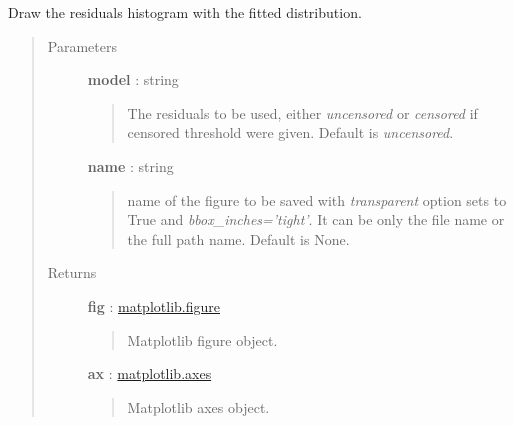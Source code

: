 \documentclass[letterpaper,10pt,english]{sphinxmanual}
\begin{document}
\begin{fulllineitems}
\begin{fulllineitems}
\begin{quote}
\begin{description}
\end{description}\end{quote}

\end{fulllineitems}


\begin{fulllineitems}
\label{_generated/otpod.UnivariateLinearModelAnalysis:otpod.UnivariateLinearModelAnalysis.drawResidualsDistribution}
Draw the residuals histogram with the fitted distribution.
\begin{quote}\begin{description}
\item[{Parameters}] \leavevmode
\textbf{model} : string
\begin{quote}

The residuals to be used, either \emph{uncensored} or
\emph{censored} if censored threshold were given. Default is \emph{uncensored}.
\end{quote}

\textbf{name} : string
\begin{quote}

name of the figure to be saved with \emph{transparent} option sets to True
and \emph{bbox\_inches='tight'}. It can be only the file name or the 
full path name. Default is None.
\end{quote}

\item[{Returns}] \leavevmode
\textbf{fig} : \href{http://matplotlib.org/api/figure\_api.html}{matplotlib.figure}
\begin{quote}

Matplotlib figure object.
\end{quote}

\textbf{ax} : \href{http://matplotlib.org/api/axes\_api.html}{matplotlib.axes}
\begin{quote}

Matplotlib axes object.
\end{quote}

\end{description}\end{quote}

\end{fulllineitems}



\end{fulllineitems}
\end{document}
